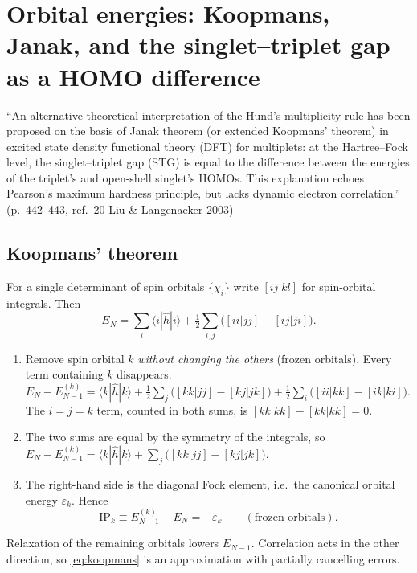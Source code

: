 \section{Orbital energies: Koopmans, Janak, and the singlet--triplet gap as a HOMO difference}\label{sec:koopmans}

\begin{reviewclaim}
``An alternative theoretical interpretation of the Hund's multiplicity rule has been proposed on the
basis of Janak theorem (or extended Koopmans' theorem) in excited state density functional theory (DFT)
for multiplets: at the Hartree--Fock level, the singlet--triplet gap (STG) is equal to the difference
between the energies of the triplet's and open-shell singlet's HOMOs. This explanation echoes Pearson's
maximum hardness principle, but lacks dynamic electron correlation.'' (p.~442--443, ref.~20 Liu \&
Langenaeker 2003)
\end{reviewclaim}

\subsection{Koopmans' theorem}
For a single determinant of spin orbitals $\{\chi_i\}$ write $[ij|kl]$ for spin-orbital integrals. Then
\begin{equation}
  E_N=\sum_i\langle i|\hat h|i\rangle+\tfrac12\sum_{i,j}\bigl([ii|jj]-[ij|ji]\bigr).
\end{equation}
\begin{enumerate}
  \item Remove spin orbital $k$ \emph{without changing the others} (frozen orbitals). Every term containing
        $k$ disappears:
        $E_N-E_{N-1}^{(k)}=\langle k|\hat h|k\rangle+\tfrac12\sum_{j}\bigl([kk|jj]-[kj|jk]\bigr)+\tfrac12\sum_{i}\bigl([ii|kk]-[ik|ki]\bigr)$.
        The $i=j=k$ term, counted in both sums, is $[kk|kk]-[kk|kk]=0$.
  \item The two sums are equal by the symmetry of the integrals, so $E_N-E_{N-1}^{(k)}=\langle k|\hat h|k\rangle+\sum_j\bigl([kk|jj]-[kj|jk]\bigr)$.
  \item The right-hand side is the diagonal Fock element, i.e.\ the canonical orbital energy $\varepsilon_k$. Hence
        \begin{equation}\label{eq:koopmans}
          \mathrm{IP}_k\equiv E_{N-1}^{(k)}-E_N=-\varepsilon_k\qquad(\text{frozen orbitals}).
        \end{equation}
\end{enumerate}
Relaxation of the remaining orbitals lowers $E_{N-1}$. Correlation acts in the other direction, so
\cref{eq:koopmans} is an approximation with partially cancelling errors.

